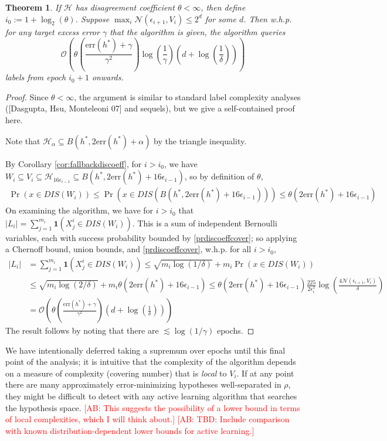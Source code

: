 \documentclass{article}[12pt]
\newcommand{\authcmt}[2]{\ifnum\Comments=1\textcolor{#1}{#2}\fi}
\newcommand{\akshay}[1]{\authcmt{red}      {[AB: #1]}}
\newtheorem{thm}{Theorem}%
\theoremstyle{named}
\DeclareMathOperator{\Prtxt}{Pr}
\newcommand{\ifn}{\mathbf{1}} %
\newcommand{\abs}[1]{\left| #1 \right|}
\newcommand{\prp}[2]{\Prtxt_{#2} \left(#1\right)}
\newcommand{\err}[1]{\mbox{err}\left(#1\right)}
\newcommand{\cH}{\mathcal{H}}
\newcommand{\cN}{\mathcal{N}}
\newcommand{\cO}[1]{\mathcal{O}\left(#1\right)}
\newcommand{\lrp}[1]{\left(#1\right)}
\begin{document}
\begin{thm}
If $\cH$ has disagreement coefficient $\theta < \infty$, then define $i_0 := 1 + \log_2 (\theta)$. 
Suppose $\max_i \cN(\epsilon_{i+1}, V_i) \leq 2^d$ for some $d$.
Then w.h.p. for any target excess error $\gamma$ that the algorithm is given, 
the algorithm queries 
$$ \cO{ \theta \lrp{\frac{\err{h^*} + \gamma}{\gamma^2}} \log \lrp{\frac{1}{\gamma}} \lrp{d + \log \lrp{\frac{1}{\delta}} } } $$
labels from epoch $i_0+1$ onwards.
\end{thm}
\begin{proof}
Since $\theta < \infty$, the argument is similar 
to standard label complexity analyses ([Dasgupta, Hsu, Monteleoni 07] and sequels), 
but we give a self-contained proof here. 

Note that $\cH_{\alpha} \subseteq B(h^*, 2 \err{h^*} + \alpha)$ by the triangle inequality. 

By Corollary \ref{cor:fallbackdiscoeff}, for $i > i_0$, 
we have $W_i \subseteq V_i \subseteq \cH_{16 \epsilon_{i-1}} \subseteq B(h^*, 2 \err{h^*} + 16 \epsilon_{i-1})$, 
so by definition of $\theta$,
\begin{align}
\label{prdiscoeffcover}
\prp{x \in DIS(W_i)}{} \leq \prp{x \in DIS(B(h^*, 2 \err{h^*} + 16 \epsilon_{i-1})) }{} \leq \theta (2 \err{h^*} + 16 \epsilon_{i-1})
\end{align}
On examining the algorithm, we have for $i > i_0$ that 
$ \abs{L_i} = \sum_{j=1}^{m_i} \ifn(X^i_j \in DIS(W_i))$. 
This is a sum of independent Bernoulli variables, 
each with success probability bounded by \eqref{prdiscoeffcover}; 
so applying a Chernoff bound, union bounds, and \eqref{prdiscoeffcover}, 
w.h.p. for all $i > i_0$,
\begin{align*}
\abs{L_i} &= \sum_{j=1}^{m_i} \ifn(X^i_j \in DIS(W_i)) \leq \sqrt{m_i \log(1/\delta)} + m_i \prp{x \in DIS(W_i)}{} \\
&\leq \sqrt{m_i \log(2/\delta)} + m_i \theta (2 \err{h^*} + 16 \epsilon_{i-1}) 
\leq \theta (2 \err{h^*} + 16 \epsilon_{i-1}) \frac{225}{2 \epsilon_i^2} \log \lrp{\frac{4 \cN(\epsilon_{i+1}, V_i)}{\delta}} \\
&= \cO{ \theta \lrp{\frac{\err{h^*} + \gamma}{\gamma^2}} \lrp{d + \log \lrp{\frac{1}{\delta}} } }
\end{align*}
The result follows by noting that there are $\lesssim \log(1/\gamma)$ epochs.
\end{proof}
We have intentionally deferred taking a supremum over epochs until this final point of the analysis; 
it is intuitive that the complexity of the algorithm depends on a measure of complexity (covering number) 
that is \emph{local} to $V_i$. 
If at any point there are many approximately error-minimizing hypotheses well-separated in $\rho$, 
they might be difficult to detect with any active learning algorithm that searches the hypothesis space.
\akshay{This suggests the possibility of a lower bound in terms of local complexities, 
which I will think about.}
\akshay{TBD: Include comparison with known distribution-dependent lower bounds for active learning.}
\end{document}
